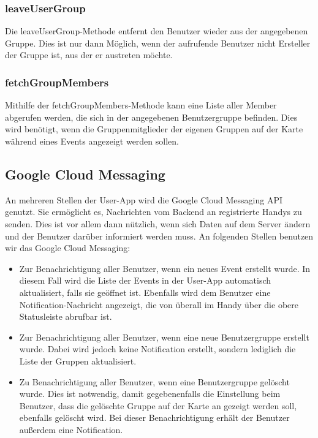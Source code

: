 \subsubsection*{leaveUserGroup}
Die leaveUserGroup-Methode entfernt den Benutzer wieder aus der angegebenen Gruppe. Dies ist nur dann Möglich, wenn der aufrufende Benutzer nicht Ersteller der Gruppe ist, aus der er austreten möchte.

\subsubsection*{fetchGroupMembers}
Mithilfe der fetchGroupMembers-Methode kann eine Liste aller Member abgerufen werden, die sich in der angegebenen Benutzergruppe befinden. Dies wird benötigt, wenn die Gruppenmitglieder der eigenen Gruppen auf der Karte während eines Events angezeigt werden sollen.


\subsection{Google Cloud Messaging}
An mehreren Stellen der User-App wird die Google Cloud Messaging API genutzt. Sie ermöglicht es, Nachrichten vom Backend an registrierte Handys zu senden. Dies ist vor allem dann nützlich, wenn sich Daten auf dem Server ändern und der Benutzer darüber informiert werden muss. An folgenden Stellen benutzen wir das Google Cloud Messaging:

\begin{itemize}
\item Zur Benachrichtigung aller Benutzer, wenn ein neues Event erstellt wurde. In diesem Fall wird die Liste der Events in der User-App automatisch aktualisiert, falls sie geöffnet ist. Ebenfalls wird dem Benutzer eine Notification-Nachricht angezeigt, die von überall im Handy über die obere Statusleiste abrufbar ist.
\item Zur Benachrichtigung aller Benutzer, wenn eine neue Benutzergruppe erstellt wurde. Dabei wird jedoch keine Notification erstellt, sondern lediglich die Liste der Gruppen aktualisiert.
\item Zu Benachrichtigung aller Benutzer, wenn eine Benutzergruppe gelöscht wurde. Dies ist notwendig, damit gegebenenfalls die Einstellung beim Benutzer, dass die gelöschte Gruppe auf der Karte an gezeigt werden soll, ebenfalls gelöscht wird. Bei dieser Benachrichtigung erhält der Benutzer außerdem eine Notification.
\end{itemize}

